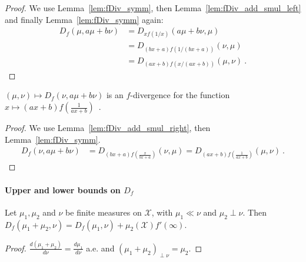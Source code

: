 \begin{proof}%
{}
We use Lemma~\ref{lem:fDiv_symm}, then Lemma~\ref{lem:fDiv_add_smul_left} and finally Lemma~\ref{lem:fDiv_symm} again:
\begin{align*}
D_f(\mu, a \mu + b \nu)
&= D_{xf(1/x)}(a \mu + b \nu, \mu)
\\
&= D_{(bx+a)f(1/(bx+a))}(\nu, \mu)
\\
&= D_{(ax+b)f(x/(ax+b))}(\mu, \nu)
\: .
\end{align*}

\end{proof}


\begin{lemma}
  \label{lem:fDiv_add_smul_right'}
  $(\mu, \nu) \mapsto D_f(\nu, a \mu + b \nu)$ is an $f$-divergence for the function $x \mapsto (ax+b)f\left(\frac{1}{ax+b}\right)$~.
\end{lemma}

\begin{proof}%
{}
We use Lemma~\ref{lem:fDiv_add_smul_right}, then Lemma~\ref{lem:fDiv_symm}.
\begin{align*}
D_f(\nu, a \mu + b \nu)
&= D_{(bx+a)f\left(\frac{x}{bx+a}\right)}(\nu, \mu)
= D_{(ax+b)f\left(\frac{1}{ax+b}\right)}(\mu, \nu)
\: .
\end{align*}
\end{proof}



\paragraph{Upper and lower bounds on $D_f$}

\begin{lemma}
  \label{lem:fDiv_absolutelyContinuous_add_mutuallySingular}
  \leanok
  Let $\mu_1, \mu_2$ and $\nu$ be finite measures on $\mathcal X$, with $\mu_1 \ll \nu$ and $\mu_2 \perp \nu$.
  Then $D_f(\mu_1 + \mu_2, \nu) = D_f(\mu_1, \nu) + \mu_2(\mathcal X) f'(\infty)$.
\end{lemma}

\begin{proof}\leanok
$\frac{d(\mu_1 + \mu_2)}{d \nu} = \frac{d \mu_1}{d \nu}$ a.e. and $(\mu_1 + \mu_2)_{\perp \nu} = \mu_2$.
\end{proof}


